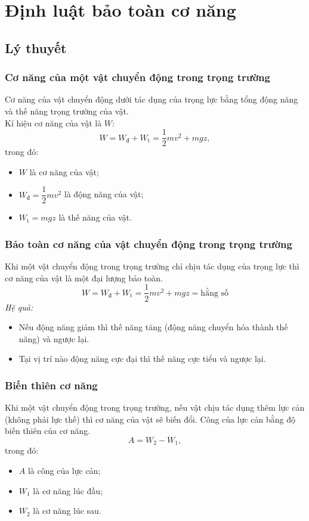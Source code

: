 \let\lesson\undefined
\newcommand{\lesson}{\phantomlesson{Bài 17: Động năng và thế năng. Định luật bảo toàn cơ năng}}
\chapter[Định luật bảo toàn cơ năng.]{Định luật bảo toàn cơ năng}
\setcounter{section}{0}
\section{Lý thuyết}
\subsection{Cơ năng của một vật chuyển động trong trọng trường}
Cơ năng của vật chuyển động dưới tác dụng của trọng lực bằng tổng động năng và thế năng trọng trường của vật.\\
Kí hiệu cơ năng của vật là $W$:
\begin{equation*}
	W=W_\text{đ}+W_\text{t}=\dfrac{1}{2}mv^2+mgz\label{CT-conang},
\end{equation*}
trong đó:
\begin{itemize}
	\item $W$ là cơ năng của vật;
	\item $W_\text{đ}=\dfrac{1}{2}mv^2$ là động năng của vật;
	\item $W_\text{t}=mgz$ là thế năng của vật.
\end{itemize}
\subsection{Bảo toàn cơ năng của vật chuyển động trong trọng trường}
Khi một vật chuyển động trong trọng trường chỉ chịu tác dụng của trọng lực thì cơ năng của vật là một đại lượng bảo toàn.
\begin{equation*}
	W=W_\text{đ}+W_\text{t}=\dfrac{1}{2}mv^2+mgz=\textrm{hằng số}
\end{equation*}
\textit{Hệ quả:}
\begin{itemize}
	\item Nếu động năng giảm thì thế năng tăng (động năng chuyển hóa thành thế năng) và ngược lại.
	\item Tại vị trí nào động năng cực đại thì thế năng cực tiểu và ngược lại.
\end{itemize}
\subsection{Biến thiên cơ năng}
Khi một vật chuyển động trong trọng trường, nếu vật chịu tác dụng thêm lực cản (không phải lực thế) thì cơ năng của vật sẽ biến đổi. Công của lực cản bằng độ biến thiên của cơ năng.
\begin{equation*}
	A=W_2-W_1,
\end{equation*}
trong đó:
\begin{itemize}
	\item $A$ là công của lực cản;
	\item $W_1$ là cơ năng lúc đầu;
	\item $W_2$ là cơ năng lúc sau.
\end{itemize}
